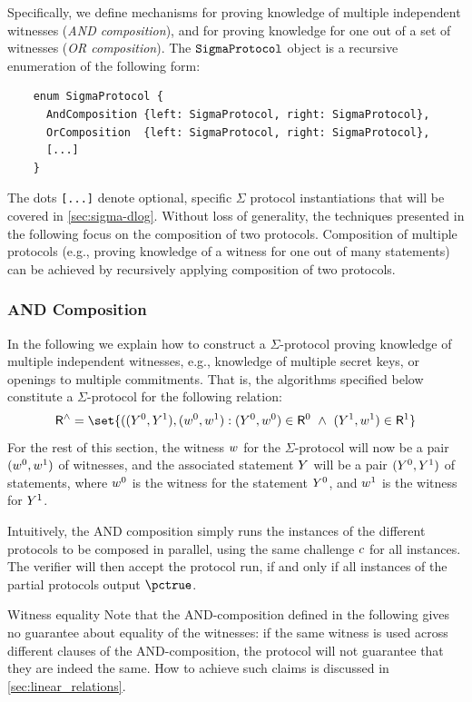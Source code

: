 \documentclass[11pt]{article}
\begin{document}
  Specifically, we define mechanisms for proving knowledge of multiple independent witnesses (\emph{AND composition}), and for proving knowledge for one out of a set of witnesses (\emph{OR composition}). The $\texttt{SigmaProtocol}$ object is a recursive enumeration of the following form:

  \begin{verbatim}
    enum SigmaProtocol {
      AndComposition {left: SigmaProtocol, right: SigmaProtocol},
      OrComposition  {left: SigmaProtocol, right: SigmaProtocol},
      [...]
    }
  \end{verbatim}

The dots \texttt{[...]} denote optional, specific $\Sigma$ protocol instantiations that will be covered in \cref{sec:sigma-dlog}.
  Without loss of generality, the techniques presented in the following focus on the composition of two protocols.
  Composition of multiple protocols (e.g., proving knowledge of a witness for one out of many statements) can be achieved by recursively applying composition of two protocols.

  \subsubsection{AND Composition}
  In the following we explain how to construct a $\Sigma$-protocol proving knowledge of multiple independent witnesses, e.g., knowledge of multiple secret keys, or openings to multiple commitments.
  That is, the algorithms specified below constitute a $\Sigma$-protocol for the following relation:
\[
  \relation^\land = \set{
    ((\statement^0,\statement^1),(\witness^0,\witness^1) : (\statement^0,\witness^0)\in \relation^0 ~\land~ (\statement^1,\witness^1)\in\relation^1}
\]
For the rest of this section, the witness $w$ for the $\Sigma$-protocol will now be a pair $(w^0, w^1)$ of witnesses, and the associated statement $Y$ will be a pair $(Y^0, Y^1)$ of statements, where $w^0$ is the witness for the statement $Y^0$, and $w^1$ is the witness for $Y^1$.

  Intuitively, the AND composition simply runs the instances of the different protocols to be composed in parallel, using the same challenge $c$ for all instances.
  The verifier will then accept the protocol run, if and only if all instances of the partial protocols output $\accept$.
  \begin{remark}{Witness equality}{}
  Note that the AND-composition defined in the following gives no guarantee about equality of the witnesses: if the same witness is used across different clauses of the AND-composition, the protocol will not guarantee that they are indeed the same.
	How to achieve such claims is discussed in \cref{sec:linear_relations}.
  \end{remark}
\end{document}
